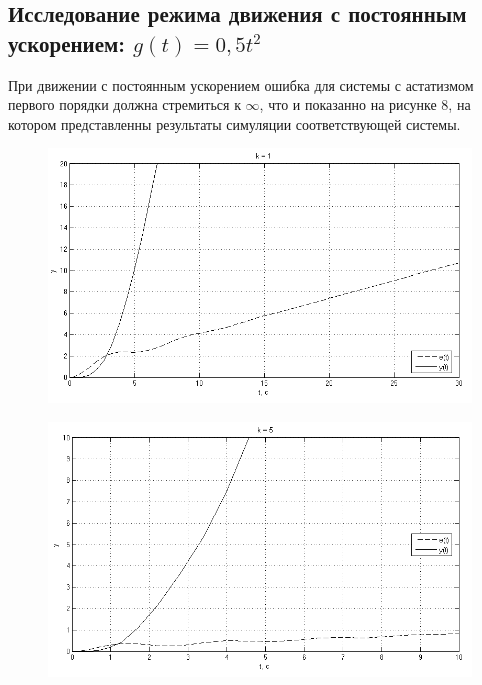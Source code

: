\documentclass[a4paper, 11pt, russian]{article}
\begin{document}
    \subsection{Исследование режима движения с постоянным ускорением: $g(t) = 0,5t^2$}
    При движении с постоянным ускорением ошибка для системы с астатизмом первого порядки должна стремиться к $\infty$, что и показанно на рисунке 8, на котором представленны результаты симуляции соответствующей системы.
    \begin{figure}[ht!]
        \centering
        \includegraphics[scale = 0.58]{aInput1ast1k.png}
    \end{figure}
    \begin{figure}[ht!]
        \centering
        \includegraphics[scale = 0.58]{aInput1ast5k.png}
    \end{figure}
\end{document}
